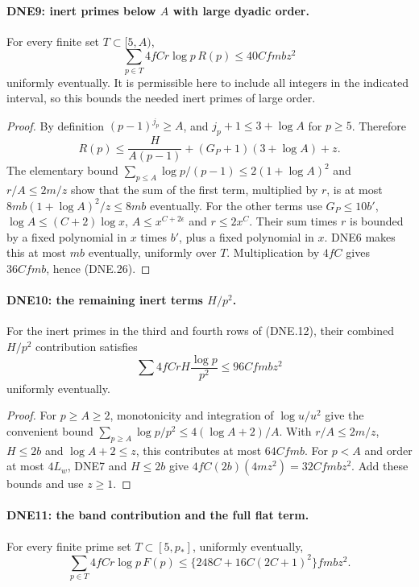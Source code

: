 \documentclass[11pt,a4paper]{article}
\numberwithin{equation}{section}
\theoremstyle{remark}\newtheorem{remark}[theorem]{Remark}
\begin{document}
\paragraph{DNE9: inert primes below $A$ with large dyadic order.}
\label{claim:DNE9}
For every finite set $T\subset[5,A)$,
\[
        \sum_{p\in T}4fCr\log p\,R(p)\le40Cfm bz^2       \tag{DNE.26}
\]
uniformly eventually.  It is permissible here to include all
integers in the indicated interval, so this bounds the needed
inert primes of large order.

\begin{proof}
By definition $(p-1)^{j_p}\ge A$, and
$j_p+1\le3+\log A$ for $p\ge5$.  Therefore
\[
 R(p)\le\frac H{A(p-1)}+(G_P+1)(3+\log A)+z.
\]
The elementary bound
$\sum_{p\le A}\log p/(p-1)\le2(1+\log A)^2$ and $r/A\le2m/z$
show that the sum of the first term, multiplied by $r$, is at
most $8mb(1+\log A)^2/z\le8mb$ eventually.
For the other terms use $G_P\le10b'$, $\log A\le(C+2)\log x$,
$A\le x^{C+2\epsilon}$ and $r\le2x^C$.
Their sum times $r$ is bounded by a fixed polynomial in $x$
times $b'$, plus a fixed polynomial in $x$.  DNE6 makes this
at most $mb$ eventually, uniformly over $T$.
Multiplication by $4fC$ gives $36Cfm b$, hence (DNE.26).
\end{proof}

\paragraph{DNE10: the remaining inert terms $H/p^2$.}
\label{claim:DNE10}
For the inert primes in the third and fourth rows of (DNE.12),
their combined $H/p^2$ contribution satisfies
\[
 \sum 4fCrH\frac{\log p}{p^2}\le96Cfm bz^2              \tag{DNE.27}
\]
uniformly eventually.

\begin{proof}
For $p\ge A\ge2$, monotonicity and integration of $\log u/u^2$
give the convenient bound
$\sum_{p\ge A}\log p/p^2\le4(\log A+2)/A$.
With $r/A\le2m/z$, $H\le2b$ and
$\log A+2\le z$, this contributes at most $64Cfm b$.
For $p<A$ and order at most $4L_w$, DNE7 and $H\le2b$ give
$4fC(2b)(4mz^2)=32Cfm bz^2$.  Add these bounds and use $z\ge1$.
\end{proof}

\paragraph{DNE11: the band contribution and the full flat term.}
\label{claim:DNE11}
For every finite prime set $T\subset[5,p_*]$, uniformly eventually,
\[
 \sum_{p\in T}4fCr\log p\,F(p)
 \le\{248C+16C(2C+1)^2\}fm bz^2.                      \tag{DNE.28}
\]
\end{document}
